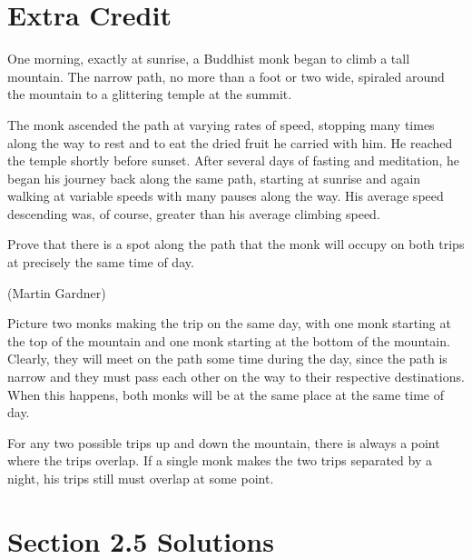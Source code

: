 \documentclass[letterpaper]{exam}
\begin{document}
  \ifprintanswers{}
  \else
    \newpage
  \fi

  \section{Extra Credit} %

  One morning, exactly at sunrise, a Buddhist monk began to climb a tall mountain.  The narrow path, no more than a
  foot or two wide, spiraled around the mountain to a glittering temple at the summit.

  The monk ascended the path at varying rates of speed, stopping many times along the way to rest and to eat the dried
  fruit he carried with him.  He reached the temple shortly before sunset.  After several days of fasting and
  meditation, he began his journey back along the same path, starting at sunrise and again walking at variable speeds
  with many pauses along the way.  His average speed descending was, of course, greater than his average climbing
  speed.

  Prove that there is a spot along the path that the monk will occupy on both trips at precisely the same time of day.

  (Martin Gardner)

  \begin{solution}
    Picture two monks making the trip on the same day, with one monk starting at the top of the mountain and one monk
    starting at the bottom of the mountain.  Clearly, they will meet on the path some time during the day, since the
    path is narrow and they must pass each other on the way to their respective destinations.  When this happens, both
    monks will be at the same place at the same time of day.  

    For any two possible trips up and down the mountain, there is always a point where the trips overlap.  If a
    single monk makes the two trips separated by a night, his trips still must overlap at some point.

  \end{solution}

  \ifprintanswers{}

    \section{Section 2.5 Solutions} 
\end{document}
